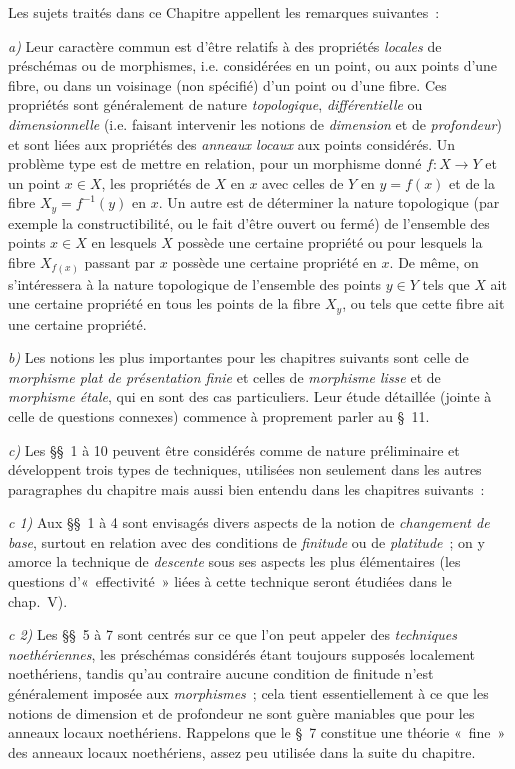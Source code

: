\clearpage
{}

Les sujets traités dans ce Chapitre appellent les remarques suivantes~:

\medskip
\noindent
\emph{a)} Leur caractère commun est d'être relatifs à des propriétés
\emph{locales} de préschémas ou de morphismes, i.e. considérées en un point,
ou aux points d'une fibre, ou dans un voisinage (non spécifié) d'un point ou
d'une fibre. Ces propriétés sont généralement de nature \emph{topologique},
\emph{différentielle} ou \emph{dimensionnelle} (i.e. faisant intervenir les
notions de \emph{dimension} et de \emph{profondeur}) et sont liées aux
propriétés des \emph{anneaux locaux} aux points considérés. Un problème type
est de mettre en relation, pour un morphisme donné $f:X\to Y$ et un point
$x\in X$, les propriétés de $X$ en $x$ avec celles de $Y$ en $y=f(x)$ et de
la fibre $X_y=f^{-1}(y)$ en $x$. Un autre est de déterminer la nature
topologique (par exemple la constructibilité, ou le fait d'être ouvert ou
fermé) de l'ensemble des points $x\in X$ en lesquels $X$ possède une certaine
propriété ou pour lesquels la fibre $X_{f(x)}$ passant par $x$ possède une
certaine propriété en $x$. De même, on s'intéressera à la nature topologique
de l'ensemble des points $y\in Y$ tels que $X$ ait une certaine propriété en
tous les points de la fibre $X_y$, ou tels que cette fibre ait une certaine
propriété.

\medskip
\noindent
\emph{b)} Les notions les plus importantes pour les chapitres suivants sont
celle de \emph{morphisme plat de présentation finie} et celles de
\emph{morphisme lisse} et de \emph{morphisme étale}, qui en sont des cas
particuliers. Leur étude détaillée (jointe à celle de questions connexes)
commence à proprement parler au §~11.

\medskip
\noindent
\emph{c)} Les §§~1 à 10 peuvent être considérés comme de nature préliminaire
et développent trois types de techniques, utilisées non seulement dans les
autres paragraphes du chapitre mais aussi bien entendu dans les chapitres
suivants~:

\medskip
\noindent
\emph{c 1)} Aux §§~1 à 4 sont envisagés divers aspects de la notion de
\emph{changement de base}, surtout en relation avec des conditions de
\emph{finitude} ou de \emph{platitude}~; on y amorce la technique de
\emph{descente} sous ses aspects les plus élémentaires (les questions
d'«~effectivité~» liées à cette technique seront étudiées dans le chap.~V).

\medskip
\noindent
\emph{c 2)} Les §§~5 à 7 sont centrés sur ce que l'on peut appeler des
\emph{techniques noethériennes}, les préschémas considérés étant toujours
supposés localement noethériens, tandis qu'au contraire aucune condition de
finitude n'est généralement imposée aux \emph{morphismes}~; cela tient
essentiellement à ce que les notions de dimension et de profondeur ne sont
guère maniables que pour les anneaux locaux noethériens. Rappelons que le §~7
constitue une théorie «~fine~» des anneaux locaux noethériens, assez peu
utilisée dans la suite du chapitre.

